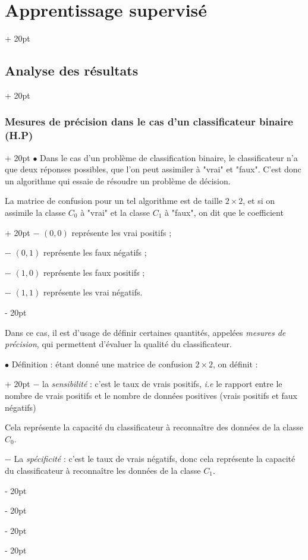 \documentclass[a4paper, 12pt, twoside]{article}
\newcommand{\ind}[1][20pt]{\advance\leftskip + #1}
\newcommand{\deind}[1][20pt]{\advance\leftskip - #1}
\newenvironment{indt}[2][20pt]{#2 \par \ind[#1]}{\par \deind} %
\begin{document}
\begin{indt}{\section{Apprentissage supervisé}}
\begin{indt}{\subsection{Analyse des résultats}}
            \begin{indt}{\subsubsection{Mesures de précision dans le cas d'un classificateur binaire (H.P)}}
                $\bullet$ Dans le cas d'un problème de classification binaire, le classificateur n'a que deux réponses possibles, que l'on peut assimiler à "vrai" et "faux".
                C'est donc un algorithme qui essaie de résoudre un problème de décision.

                \begin{indt}{La matrice de confusion pour un tel algorithme est de taille $2 \times 2$, et si on assimile la classe $C_0$ à "vrai" et la classe $C_1$ à "faux", on dit que le coefficient}
                    $-$ $(0, 0)$ représente les vrai positifs ;

                    $-$ $(0, 1)$ représente les faux négatifs ;

                    $-$ $(1, 0)$ représente les faux positifs ;

                    $-$ $(1, 1)$ représente les vrai négatifs.
                \end{indt}

                Dans ce cas, il est d'usage de définir certaines quantités, appelées \emph{mesures de précision}, qui permettent d'évaluer la qualité du classificateur.

                \vspace{12pt}
                
                \begin{indt}{$\bullet$ Définition : étant donné une matrice de confusion $2 \times 2$, on définit :}
                    $-$ la \emph{sensibilité} : c'est le taux de vrais positifs, \textit{i.e} le rapport entre le nombre de vrais positifs et le nombre de données positives (vrais positifs et faux négatifs)

                    Cela représente la capacité du classificateur à reconnaître des données de la classe $C_0$.

                    \vspace{6pt}
                    
                    $-$ La \emph{spécificité} : c'est le taux de vrais négatifs, donc cela représente la capacité du classificateur à reconnaître les données de la classe $C_1$.

                    \vspace{6pt}
                    

\end{indt}
\end{indt}
\end{indt}
\end{indt}
\end{document}
